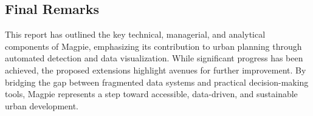\subsection{Final Remarks}
This report has outlined the key technical, managerial, and analytical
components of Magpie, emphasizing its contribution to urban planning through
automated detection and data visualization. While significant progress has been
achieved, the proposed extensions highlight avenues for further improvement. By
bridging the gap between fragmented data systems and practical decision-making
tools, Magpie represents a step toward accessible, data-driven, and sustainable
urban development.

\newpage{}